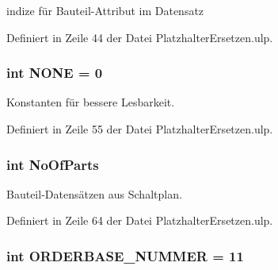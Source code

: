 indize für Bauteil-\/\+Attribut im Datensatz 



Definiert in Zeile 44 der Datei Platzhalter\+Ersetzen.\+ulp.

\hypertarget{_platzhalter_ersetzen_8ulp_a8da3a66cae7ac2c40966de471684f3fb}{}
\subsubsection[{N\+O\+N\+E}]{\setlength{\rightskip}{0pt plus 5cm}int N\+O\+N\+E = 0}\label{_platzhalter_ersetzen_8ulp_a8da3a66cae7ac2c40966de471684f3fb}


Konstanten für bessere Lesbarkeit. 



Definiert in Zeile 55 der Datei Platzhalter\+Ersetzen.\+ulp.

\hypertarget{_platzhalter_ersetzen_8ulp_a92a0e91aab3e1ff3d8857072adcd7c32}{}
\subsubsection[{No\+Of\+Parts}]{\setlength{\rightskip}{0pt plus 5cm}int No\+Of\+Parts}\label{_platzhalter_ersetzen_8ulp_a92a0e91aab3e1ff3d8857072adcd7c32}


Bauteil-\/\+Datensätzen aus Schaltplan. 



Definiert in Zeile 64 der Datei Platzhalter\+Ersetzen.\+ulp.

\hypertarget{_platzhalter_ersetzen_8ulp_a7cdee93856dbfbbf6b1351c9525f6cb0}{}
\subsubsection[{O\+R\+D\+E\+R\+B\+A\+S\+E\+\_\+\+N\+U\+M\+M\+E\+R}]{\setlength{\rightskip}{0pt plus 5cm}int O\+R\+D\+E\+R\+B\+A\+S\+E\+\_\+\+N\+U\+M\+M\+E\+R = 11}\label{_platzhalter_ersetzen_8ulp_a7cdee93856dbfbbf6b1351c9525f6cb0}


